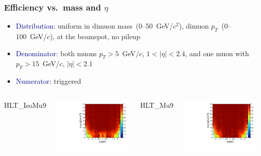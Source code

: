 \documentclass[compress]{beamer}
\begin{document}
\begin{frame}
\frametitle{Efficiency vs.\ mass and $\eta$}
\begin{itemize}
\item \textcolor{darkblue}{Distribution:} uniform in dimuon mass~(0--50~GeV/$c^2$), dimuon $p_T$~(0--100~GeV/$c$), at the beamspot, no pileup

\item \textcolor{darkblue}{Denominator:} both muons $p_T > 5$~GeV/$c$, $1 < |\eta| < 2.4$, and one muon with $p_T > 15$~GeV/$c$, $|\eta| < 2.1$

\item \textcolor{darkblue}{Numerator:} triggered
\end{itemize}

\vfill
\begin{columns}
\centering HLT\_IsoMu9

\includegraphics[width=\linewidth]{masseta_pluscut_IsoMu9.pdf}

\centering HLT\_Mu9

\includegraphics[width=\linewidth]{masseta_pluscut_Mu9.pdf}


\end{columns}
\end{frame}
\end{document}
